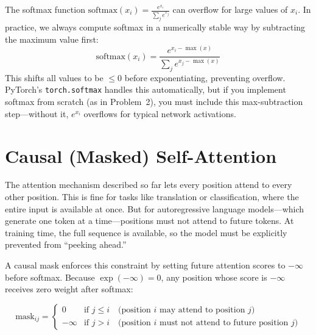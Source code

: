 \begin{keyconcept}
  The softmax function $\text{softmax}(x_i) = \frac{e^{x_i}}{\sum_j e^{x_j}}$
  can overflow for large values of $x_i$. In practice, we always compute
  softmax in a numerically stable way by subtracting the maximum value
  first:
  \[
    \text{softmax}(x_i) = \frac{e^{x_i - \max(x)}}{\sum_j e^{x_j - \max(x)}}
  \]
  This shifts all values to be $\leq 0$ before exponentiating, preventing
  overflow. PyTorch's \texttt{torch.softmax} handles this automatically, but
  if you implement softmax from scratch (as in Problem~2), you must include
  this max-subtraction step---without it, $e^{x_i}$ overflows for typical
  network activations.
\end{keyconcept}

\section{Causal (Masked) Self-Attention}

The attention mechanism described so far lets every position attend to every
other position. This is fine for tasks like translation or classification, where
the entire input is available at once. But for autoregressive language
models---which generate one token at a time---positions must not attend to
future tokens. At training time, the full sequence is available, so the model
must be explicitly prevented from ``peeking ahead.''

A causal mask enforces this constraint by setting future attention scores to
$-\infty$ before softmax. Because $\exp(-\infty) = 0$, any position whose score
is $-\infty$ receives zero weight after softmax:

\[
  \text{mask}_{ij} =
  \begin{cases}
    0 & \text{if } j \leq i \quad\text{(position $i$ may attend to position $j$)} \\
    -\infty & \text{if } j > i \quad\text{(position $i$ must not attend to future position $j$)}
  \end{cases}
\]


